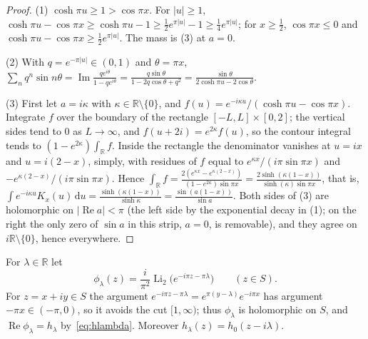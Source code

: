 \documentclass[11pt]{amsart}
\theoremstyle{definition}
\theoremstyle{remark}
\numberwithin{equation}{section}
\newcommand{\R}{\mathbb{R}}
\renewcommand{\Re}{\operatorname{Re}}
\renewcommand{\Im}{\operatorname{Im}}
\newcommand{\Li}{\operatorname{Li}_2}
\newcommand{\dd}{\,\mathrm{d}}
\begin{document}
\begin{proof}
(1) $\cosh\pi u\ge1>\cos\pi x$. For $|u|\ge1$, $\cosh\pi u-\cos\pi x\ge\cosh\pi u-1\ge\frac12e^{\pi|u|}-1\ge\frac14e^{\pi|u|}$;
for $x\ge\frac12$, $\cos\pi x\le0$ and $\cosh\pi u-\cos\pi x\ge\frac12e^{\pi|u|}$. The mass is (3) at $a=0$.

(2) With $q=e^{-\pi|u|}\in(0,1)$ and $\theta=\pi x$,
$\sum_nq^n\sin n\theta=\Im\frac{qe^{i\theta}}{1-qe^{i\theta}}=\frac{q\sin\theta}{1-2q\cos\theta+q^2}=\frac{\sin\theta}{2\cosh\pi u-2\cos\theta}$.

(3) First let $a=i\kappa$ with $\kappa\in\R\setminus\{0\}$, and $f(u)=e^{-i\kappa u}/(\cosh\pi u-\cos\pi x)$. Integrate $f$ over the
boundary of the rectangle $[-L,L]\times[0,2]$; the vertical sides tend to $0$ as $L\to\infty$, and
$f(u+2i)=e^{2\kappa}f(u)$, so the contour integral tends to $(1-e^{2\kappa})\int_\R f$. Inside the rectangle the
denominator vanishes at $u=ix$ and $u=i(2-x)$, simply, with residues of $f$ equal to $e^{\kappa x}/(i\pi\sin\pi x)$ and
$-e^{\kappa(2-x)}/(i\pi\sin\pi x)$. Hence
$\int_\R f=\frac{2(e^{\kappa x}-e^{\kappa(2-x)})}{(1-e^{2\kappa})\sin\pi x}=\frac{2\sinh(\kappa(1-x))}{\sinh(\kappa)\sin\pi x}$, that is,
$\int e^{-i\kappa u}K_x(u)\dd u=\frac{\sinh(\kappa(1-x))}{\sinh\kappa}=\frac{\sin(a(1-x))}{\sin a}$. Both sides of (3) are
holomorphic on $|\Re a|<\pi$ (the left side by the exponential decay in (1); on the right the only zero of $\sin a$ in
this strip, $a=0$, is removable), and they agree on $i\R\setminus\{0\}$, hence everywhere.
\end{proof}

For $\lambda\in\R$ let
\begin{equation}\label{eq:philambda}
\phi_\lambda(z)=\frac{i}{\pi^2}\Li\bigl(e^{-i\pi z-\pi\lambda}\bigr)\qquad(z\in S).
\end{equation}
For $z=x+iy\in S$ the argument $e^{-i\pi z-\pi\lambda}=e^{\pi(y-\lambda)}e^{-i\pi x}$ has argument $-\pi x\in(-\pi,0)$, so it
avoids the cut $[1,\infty)$; thus $\phi_\lambda$ is holomorphic on $S$, and $\Re\phi_\lambda=h_\lambda$ by~\eqref{eq:hlambda}.
Moreover $h_\lambda(z)=h_0(z-i\lambda)$.
\end{document}

